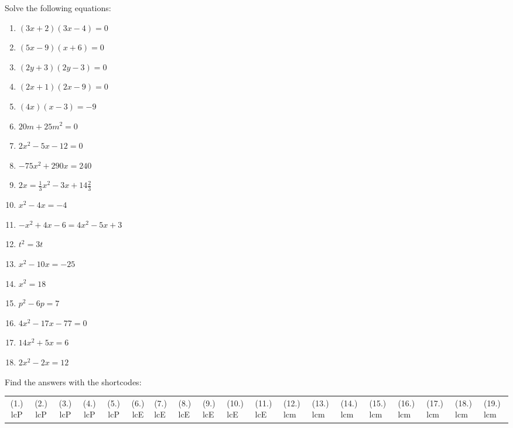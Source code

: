 \begin{exercises}{ }
{
Solve the following equations:
\begin{multicols}{2}
\begin{enumerate}[itemsep=5pt, label=\textbf{\arabic*}. ] 
\item  $(3x+2)(3x-4)=0$
\item  $(5x-9)(x+6)=0$
\item  $(2y+3)(2y-3)=0$ 
\item  $(2x+1)(2x-9)=0$    
\item  $(4x)(x-3)=-9$       
\item  $20m+25{m}^{2}=0$
\item  $2{x}^{2}-5x-12=0$  
\item  $-75{x}^{2}+290x=240$
\item  $2x=\frac{1}{3}{x}^{2}-3x+14\frac{2}{3}$
\item  ${x}^{2}-4x=-4$      
\item  $-{x}^{2}+4x-6=4{x}^{2}-5x+3$       
\item  ${t}^{2}=3t$  
\item  ${x}^{2}-10x=-25$      
\item  ${x}^{2}=18$
\item  ${p}^{2}-6p=7$
\item  $4{x}^{2}-17x-77=0$
\item  $14{x}^{2}+5x=6$
\item  $2{x}^{2}-2x=12$              
\end{enumerate}
\end{multicols}
\practiceinfo
\par {} Find the answers with the shortcodes:
\par\begin{tabular}[h]{cccccc}
(1.) lcP  &  (2.) lcP  &  (3.) lcP  &  (4.) lcP  &  (5.) lcP  &  (6.) lcE  &  (7.) lcE  &  (8.) lcE  &  (9.) lcE  &  (10.) lcE  &  (11.) lcE  &  (12.) lcm  &  (13.) lcm  &  (14.) lcm  &  (15.) lcm  &  (16.) lcm  &  (17.) lcm  &  (18.) lcm  &  (19.) lcm  & \end{tabular}
}
\end{exercises}

